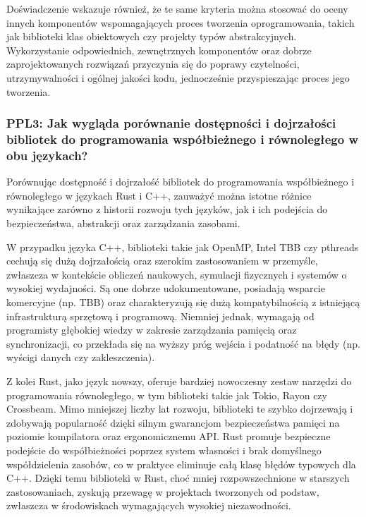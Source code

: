     Doświadczenie wskazuje również, że te same kryteria można stosować do oceny innych komponentów wspomagających proces tworzenia oprogramowania, takich jak biblioteki klas obiektowych czy projekty typów abstrakcyjnych. Wykorzystanie odpowiednich, zewnętrznych komponentów oraz dobrze zaprojektowanych rozwiązań przyczynia się do poprawy czytelności, utrzymywalności i ogólnej jakości kodu, jednocześnie przyspieszając proces jego tworzenia.

\subsubsection{PPL3: Jak wygląda porównanie dostępności i dojrzałości bibliotek do programowania współbieżnego i równoległego w obu językach?}
Porównując dostępność i dojrzałość bibliotek do programowania współbieżnego i równoległego w językach Rust i C++, zauważyć można istotne różnice wynikające zarówno z historii rozwoju tych języków, jak i ich podejścia do bezpieczeństwa, abstrakcji oraz zarządzania zasobami.

W przypadku języka C++, biblioteki takie jak OpenMP, Intel TBB czy pthreads cechują się dużą dojrzałością oraz szerokim zastosowaniem w przemyśle, zwłaszcza w kontekście obliczeń naukowych, symulacji fizycznych i systemów o wysokiej wydajności. Są one dobrze udokumentowane, posiadają wsparcie komercyjne (np. TBB) oraz charakteryzują się dużą kompatybilnością z istniejącą infrastrukturą sprzętową i programową. Niemniej jednak, wymagają od programisty głębokiej wiedzy w zakresie zarządzania pamięcią oraz synchronizacji, co przekłada się na wyższy próg wejścia i podatność na błędy (np. wyścigi danych czy zakleszczenia).

Z kolei Rust, jako język nowszy, oferuje bardziej nowoczesny zestaw narzędzi do programowania równoległego, w tym biblioteki takie jak Tokio, Rayon czy Crossbeam. Mimo mniejszej liczby lat rozwoju, biblioteki te szybko dojrzewają i zdobywają popularność dzięki silnym gwarancjom bezpieczeństwa pamięci na poziomie kompilatora oraz ergonomicznemu API. Rust promuje bezpieczne podejście do współbieżności poprzez system własności  i brak domyślnego współdzielenia zasobów, co w praktyce eliminuje całą klasę błędów typowych dla C++. Dzięki temu biblioteki w Rust, choć mniej rozpowszechnione w starszych zastosowaniach, zyskują przewagę w projektach tworzonych od podstaw, zwłaszcza w środowiskach wymagających wysokiej niezawodności.

